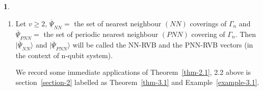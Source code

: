 \documentclass[a4paper,12pt]{article}
\theoremstyle{definition}
\theoremstyle{underlinethm}
\theoremstyle{definition}
\newtheorem{subsubsec}{}[subsection]
\begin{document}
\begin{subsubsec}
\begin{enumerate}[label=(\alph*)]
\item Let $v \geq 2 $, $\underline{\overline{\Psi}}_{NN} =$ the set of nearest neighbour $(NN)$ coverings of $\Gamma_{n}$ and $\underline{\overline{\Psi}}_{PNN} =$ the set of periodic nearest neighbour $(PNN)$  covering of $\Gamma_{n}$. Then $|\underline{\overline{\Psi}}_{NN} \rangle$ and $| \underline{\overline{\Psi}}_{PNN} \rangle$ will be called the NN-RVB and the PNN-RVB vectors (in the context of n-qubit system).

We record some immediate applications of Theorem~\eqref{thm-2.1}, 2.2 above is section~\eqref{section-2} labelled as Theorem~\eqref{thm-3.1} and Example~\eqref{example-3.1}.

\end{enumerate}

\end{subsubsec}
\end{document}
